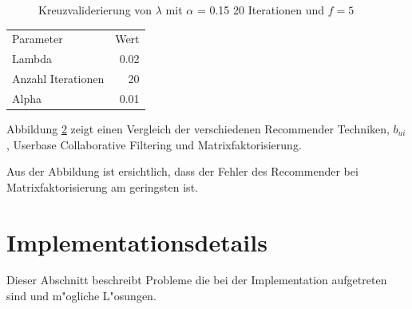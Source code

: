 \documentclass[a4paper, 12pt]{article}
\begin{document}
\begin{figure}
  \centering
{}
\label{fig:lambda}
\caption{Kreuzvaliderierung von $\lambda$ mit $\alpha$ = 0.15 20 Iterationen und $f = 5$}
\end{figure}



\begin{center}
\begin{tabular}{lr}
 Parameter           &  Wert  \\
 Lambda              &  0.02  \\
 Anzahl Iterationen  &    20  \\
 Alpha               &  0.01  \\
\end{tabular}
\end{center}

Abbildung \ref{fig:compare} zeigt einen Vergleich der verschiedenen Recommender Techniken, $b_{ui}$, Userbase Collaborative Filtering und Matrixfaktorisierung.

\begin{figure}
\centering
\label{fig:compare}
\caption{}
\end{figure}

Aus der Abbildung ist ersichtlich, dass der Fehler des Recommender bei Matrixfaktorisierung am geringsten ist.

\section{Implementationsdetails}
\label{sec:ram}

Dieser Abschnitt beschreibt Probleme die bei der Implementation aufgetreten sind und m"ogliche L"osungen.
\end{document}
